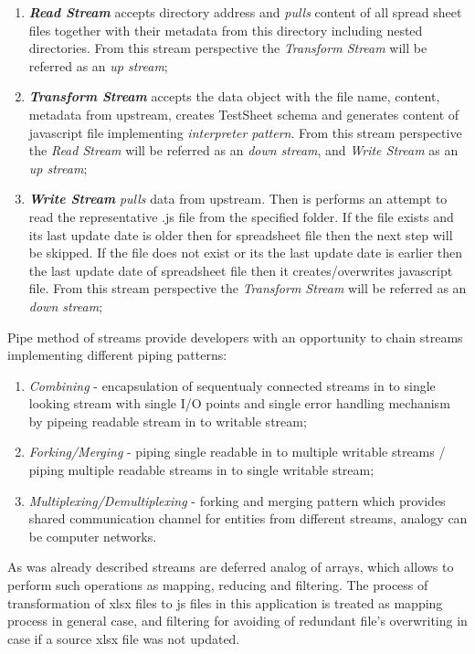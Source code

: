 \begin{enumerate}
	\item \textbf{\textit{Read Stream}} accepts directory address and \textit{pulls} content of all spread sheet files together with their metadata  from this directory including nested directories. From this stream perspective the \textit{Transform Stream} will be referred as an \textit{up stream};
	\item \textbf{\textit{Transform Stream}} accepts the data object with the file name, content, metadata from upstream, creates TestSheet schema and generates content of javascript file implementing \textit{interpreter pattern}. From this stream perspective the \textit{Read Stream} will be referred as an \textit{down stream}, and \textit{Write Stream} as an \textit{up stream}; 
	\item \textbf{\textit{Write Stream}} \textit{pulls} data from upstream. Then is performs an attempt to read the representative .js file from the  specified folder. If the file exists and its last update date is older then for spreadsheet file then the next step will be skipped. If the file does not exist or its the last update date is earlier then the last update date of spreadsheet file then it creates/overwrites javascript file. From this stream perspective the \textit{Transform Stream} will be referred as an \textit{down stream};
\end{enumerate}

Pipe method of streams provide developers with an opportunity to chain streams implementing different piping patterns:
\begin{enumerate}
	\item \textit{Combining} - encapsulation of sequentualy connected streams in to single looking stream with single I/O points and single error handling mechanism by pipeing readable stream in to writable stream;
	\item \textit{Forking/Merging} - piping single readable in to multiple writable streams /  piping multiple readable streams in to single writable stream;
	\item \textit{Multiplexing/Demultiplexing} - forking and merging pattern which provides shared communication channel for entities from different streams, analogy can be computer networks.
\end{enumerate}

As was already described streams are deferred analog of arrays, which allows to perform such operations as mapping, reducing and filtering. The process of transformation of xlsx files to js files in this application is treated as mapping process in general case, and filtering for avoiding of redundant file's overwriting in case if a source xlsx file was not updated.

